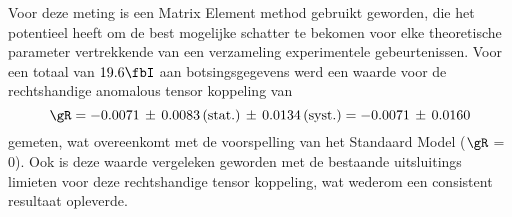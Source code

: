 Voor deze meting is een Matrix Element method gebruikt geworden, die het potentieel heeft om de best mogelijke schatter te bekomen voor elke theoretische parameter vertrekkende van een verzameling experimentele gebeurtenissen.
Voor een totaal van $19.6 \fbI$ aan botsingsgegevens werd een waarde voor de rechtshandige anomalous tensor koppeling van
\begin{equation}
 \gR = -0.0071 \, \pm \, 0.0083 \, (\textrm{stat.}) \, \pm \, 0.0134  \, (\textrm{syst.}) = -0.0071 \, \pm \, 0.0160 \nonumber
\end{equation}
gemeten, wat overeenkomt met de voorspelling van het Standaard Model ($\gR$ = 0).
Ook is deze waarde vergeleken geworden met de bestaande uitsluitings limieten voor deze rechtshandige tensor koppeling, wat wederom een consistent resultaat opleverde.
